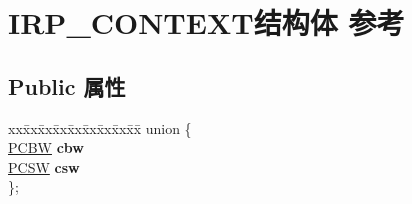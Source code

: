 \hypertarget{struct_i_r_p___c_o_n_t_e_x_t}{}\section{I\+R\+P\+\_\+\+C\+O\+N\+T\+E\+X\+T结构体 参考}
\label{struct_i_r_p___c_o_n_t_e_x_t}
\subsection*{Public 属性}
\begin{DoxyCompactItemize}
\item 
\mbox{\label{struct_i_r_p___c_o_n_t_e_x_t_ad448adc920336a6410d69da79dc9e144}} 
\begin{tabbing}
xx\=xx\=xx\=xx\=xx\=xx\=xx\=xx\=xx\=\kill
union \{\\
\>\hyperlink{struct_c_b_w}{PCBW} {\bfseries cbw}\\
\>\hyperlink{struct_c_s_w}{PCSW} {\bfseries csw}\\
\}; \\


\end{tabbing}
\end{DoxyCompactItemize}
